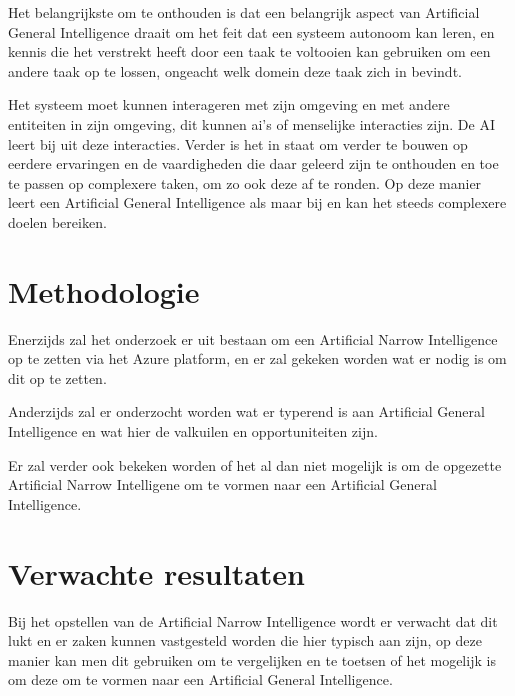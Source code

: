 Het belangrijkste om te onthouden is dat een belangrijk aspect van Artificial General Intelligence draait om het feit dat een systeem autonoom kan leren, en kennis die het verstrekt heeft door een taak te voltooien kan gebruiken om een andere taak op te lossen, ongeacht welk domein deze taak zich in bevindt. 

Het systeem moet kunnen interageren met zijn omgeving en met andere entiteiten in zijn omgeving, dit kunnen ai's of menselijke interacties zijn. De AI leert bij uit deze interacties. Verder is het in staat om verder te bouwen op eerdere ervaringen en de vaardigheden die daar geleerd zijn te onthouden en toe te passen op complexere taken, om zo ook deze af te ronden. Op deze manier leert een Artificial General Intelligence als maar bij en kan het steeds complexere doelen bereiken.

\autocite{goertzel2007artificial}


\section{Methodologie}
\label{sec:methodologie}
Enerzijds zal het onderzoek er uit bestaan om een Artificial Narrow Intelligence op te zetten via het Azure platform, en er zal gekeken worden wat er nodig is om dit op te zetten.

Anderzijds zal er onderzocht worden wat er typerend is aan Artificial General Intelligence en wat hier de valkuilen en opportuniteiten zijn. 

Er zal verder ook bekeken worden of het al dan niet mogelijk is om de opgezette Artificial Narrow Intelligene om te vormen naar een Artificial General Intelligence. 

\section{Verwachte resultaten}
\label{sec:verwachte_resultaten}

Bij het opstellen van de Artificial Narrow Intelligence wordt er verwacht dat dit lukt en er zaken kunnen vastgesteld worden die hier typisch aan zijn, op deze manier kan men dit gebruiken om te vergelijken en te toetsen of het mogelijk is om deze om te vormen naar een Artificial General Intelligence.


